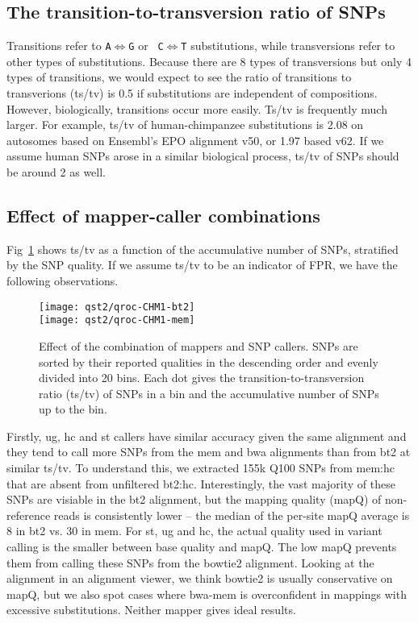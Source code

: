 \documentclass{bioinfo}
\newcommand{\textssf}[1]{\textsf{\footnotesize #1}}
\begin{document}
\subsection{The transition-to-transversion ratio of SNPs}
Transitions refer to {\tt A}$\Leftrightarrow${\tt G} or {\tt
C}$\Leftrightarrow${\tt T} substitutions, while transversions refer to other
types of substitutions. Because there are 8 types of transversions but only 4
types of transitions, we would expect to see the ratio of transitions to
transverions (ts/tv) is 0.5 if substitutions are independent of compositions.
However, biologically, transitions occur more easily. Ts/tv is frequently much
larger. For example, ts/tv of human-chimpanzee substitutions is 2.08 on
autosomes based on Ensembl's EPO alignment v50, or 1.97 based v62. If we assume
human SNPs arose in a similar biological process, ts/tv of SNPs should be
around 2 as well.

\subsection{Effect of mapper-caller combinations}

Fig~\ref{fig:qroc1} shows ts/tv as a function of the accumulative number of
SNPs, stratified by the SNP quality. If we assume ts/tv to be an indicator of
FPR, we have the following observations.

\begin{figure}[!hp]
\centering\texttt{[image: qst2/qroc-CHM1-bt2]}\\
\centering\texttt{[image: qst2/qroc-CHM1-mem]}
\caption{Effect of the combination of mappers and SNP callers. SNPs are sorted
by their reported qualities in the descending order and evenly divided into 20
bins. Each dot gives the transition-to-transversion ratio (ts/tv) of SNPs in a
bin and the accumulative number of SNPs up to the bin.}\label{fig:qroc1} \end{figure}

Firstly, \textssf{ug}, \textssf{hc} and \textssf{st} callers have similar
accuracy given the same alignment and they tend to call more SNPs from the
\textssf{mem} and \textssf{bwa} alignments than from \textssf{bt2} at similar
ts/tv. To understand this, we extracted 155k Q100 SNPs from \textssf{mem:hc}
that are absent from unfiltered \textssf{bt2:hc}. Interestingly, the vast
majority of these SNPs are visiable in the \textssf{bt2} alignment, but the
mapping quality (mapQ) of non-reference reads is consistently lower -- the
median of the per-site mapQ average is 8 in \textssf{bt2} vs. 30 in \textssf{mem}.
For \textssf{st}, \textssf{ug} and \textssf{hc}, the actual quality used in
variant calling is the smaller between base quality and mapQ. The low mapQ
prevents them from calling these SNPs from the \textssf{bowtie2} alignment.
Looking at the alignment in an alignment viewer, we think \textssf{bowtie2} is
usually conservative on mapQ, but we also spot cases where bwa-mem is
overconfident in mappings with excessive substitutions. Neither mapper gives
ideal results.
\end{document}
